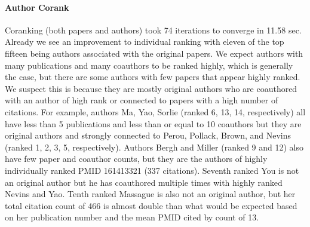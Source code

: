 \paragraph{Author Corank}
Coranking (both papers and authors) took 74 iterations to converge in 11.58 sec. Already we see an improvement to individual ranking with eleven of the top fifteen being authors associated with the original papers. We expect authors with many publications and many coauthors to be ranked highly, which is generally the case, but there are some authors with few papers that appear highly ranked. We suspect this is because they are mostly original authors who are coauthored with an author of high rank or connected to papers with a high number of citations. For example, authors Ma, Yao, Sorlie (ranked 6, 13, 14, respectively) all have less than 5 publications and less than or equal to 10 coauthors but they are original authors and strongly connected to Perou, Pollack, Brown, and Nevins (ranked 1, 2, 3, 5, respectively). Authors Bergh and Miller (ranked 9 and 12) also have few paper and coauthor counts, but they are the authors of highly individually ranked PMID 161413321 (337 citations). Seventh ranked You is not an original author but he has coauthored multiple times with highly ranked Nevins and Yao. Tenth ranked Massague is also not an original author, but her total citation count of 466 is almost double than what would be expected based on her publication number and the mean PMID cited by count of 13. 

